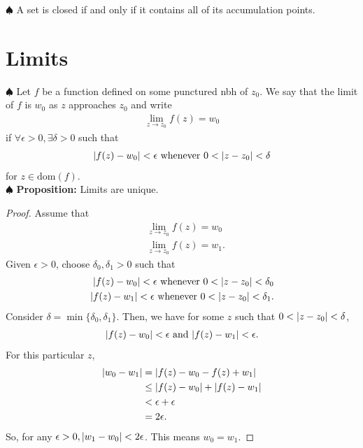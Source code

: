 \documentclass{article}
\theoremstyle{definition}
\newcommand{\nn}{\nonumber}
\begin{document}
\noindent $\spadesuit$ A set is closed if and only if it contains all of its accumulation points.




\section{Limits}



\noindent $\spadesuit$ Let $f$ be a function defined on some punctured nbh of $z_0$. We say that the limit of $f$ is $w_0$ as $z$ approaches $z_0$ and write 
\begin{align}
\lim_{z\to z_0} f(z) = w_0
\end{align}
if $\forall \epsilon > 0, \exists \delta  > 0$ such that
\begin{align}
\abs{f(z) - w_0} < \epsilon \text{ whenever } 0 < \abs{z- z_0} < \delta
\end{align}
for $z \in \text{dom}(f)$. \\

\noindent $\spadesuit$ \textbf{Proposition:} Limits are unique.

\begin{proof}
	Assume that 
	\begin{align}
	&\lim_{z\to z_0} f(z) = w_0\nn\\
	&\lim_{z\to z_0} f(z) = w_1.
	\end{align}
	Given $\epsilon > 0$, choose $\delta_0, \delta_1 > 0$ such that
	\begin{align}
	\abs{f(z) - w_0} < \epsilon \text{ whenever } 0 < \abs{z- z_0} < \delta_0\nn\\
	\abs{f(z) - w_1} < \epsilon \text{ whenever } 0 < \abs{z- z_0} < \delta_1.
	\end{align}
	Consider $\delta = \min\{\delta_0, \delta_1\}$. Then, we have for some $z$ such that $0 < \abs{z - z_0} < \delta$,
	\begin{align}
	\abs{f(z) - w_0} < \epsilon \text{ and } \abs{f(z) - w_1} < \epsilon.
	\end{align}
	For this particular $z$, 
	\begin{align}
	\abs{w_0 - w_1} &= \abs{f(z) - w_0 - f(z) + w_1}\nn\\
	&\leq \abs{f(z) - w_0} + \abs{f(z) - w_1}\nn\\
	&< \epsilon + \epsilon \nn\\
	&= 2\epsilon.
	\end{align}
	So, for any $\epsilon > 0, \abs{w_1 - w_0} < 2\epsilon$. This means $w_0 = w_1$.
\end{proof}
\end{document}

